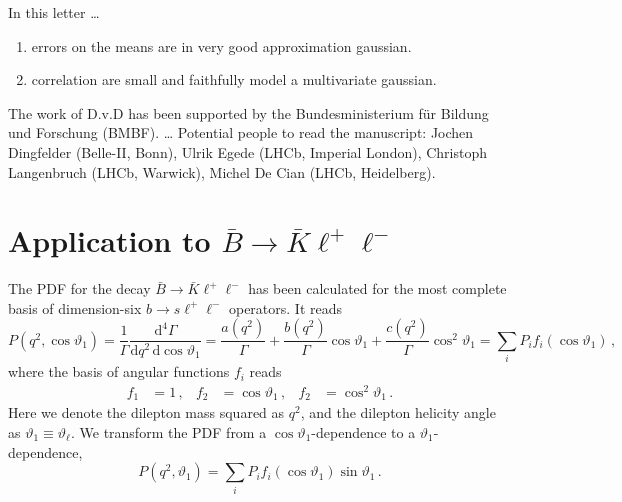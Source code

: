 \documentclass[aps,prd,reprint,nofootinbib,preprintnumbers]{revtex4}
\newcommand{\dd}{\text{d}}
\renewcommand{\theta}{\vartheta}
\newcommand{\danny}[1]{{\color{purple}#1}}
\begin{document}
In this letter \dots
\begin{enumerate}
    \item errors on the means are in very good approximation gaussian.
    \item correlation are small and faithfully model a multivariate gaussian.
\end{enumerate}


\acknowledgments

The work of D.v.D has been supported by the Bundesministerium f\"ur Bildung und Forschung (BMBF).
\dots
\danny{Potential people to read the manuscript: Jochen Dingfelder (Belle-II, Bonn), Ulrik Egede (LHCb, Imperial London), Christoph Langenbruch (LHCb, Warwick), Michel De Cian (LHCb, Heidelberg).}

\appendix

\section{Application to $\bar{B}\to\bar{K}\ell^+\ell^-$}
\label{app:btokll}

The PDF for the decay $\bar{B}\to\bar{K}\ell^+\ell^-$ has been calculated for the most
complete basis of dimension-six $b\to s \ell^+\ell^-$ operators. It reads \cite{Bobeth:2007dw,Bobeth:2012vn}
\begin{equation}
    P(q^2, \cos\theta_1) = \frac{1}{\Gamma} \frac{\dd^4\Gamma}{\dd q^2\,\dd \cos\theta_1} = \frac{a(q^2)}{\Gamma} + \frac{b(q^2)}{\Gamma} \cos\theta_1 + \frac{c(q^2)}{\Gamma} \cos^2\theta_1 = \sum_i P_i f_i(\cos\theta_1)\,,
\end{equation}
where the basis of angular functions $f_i$ reads
\begin{equation}
\begin{aligned}
    f_1 & = 1\,, &
    f_2 & = \cos\theta_1\,, &
    f_2 & = \cos^2\theta_1\,.
\end{aligned}
\end{equation}
Here we denote the dilepton mass squared as $q^2$, and the dilepton helicity angle as $\theta_1 \equiv \theta_{\ell}$. We transform the PDF from a $\cos\theta_1$-dependence
to a $\theta_1$-dependence,
\begin{equation}
    P(q^2, \theta_1) = \sum_i P_i f_i(\cos\theta_1) \sin \theta_1\,.
\end{equation}
\end{document}

